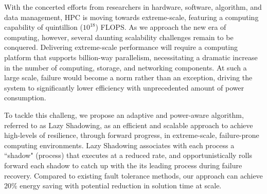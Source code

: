 With the concerted efforts from researchers in hardware, software, algorithm, and data management, HPC is moving towards extreme-scale, featuring a computing capability of quintillion ($10^{18}$) FLOPS. 
As we approach the new era of computing, however, several daunting scalability challenges remain to be conquered. Delivering extreme-scale performance will require a computing platform that supports billion-way parallelism, necessitating a dramatic increase in the number of computing, storage, and networking components. At such a large scale, failure would become a norm rather than an exception, driving the system to significantly lower efficiency with unprecedented amount of power consumption. %

To tackle this challeng, we propose an adaptive and power-aware algorithm, referred to as Lazy Shadowing, as an efficient and scalable approach to achieve high-levels of resilience, through forward progress, in extreme-scale, failure-prone computing environments. 
Lazy Shadowing associates with each process a ``shadow" (process) that executes at a reduced rate, and opportunistically rolls forward each shadow to catch up with the its leading process during failure recovery.
Compared to existing fault tolerance methods, our approach can achieve 20\% energy saving with potential reduction in solution time at scale.
